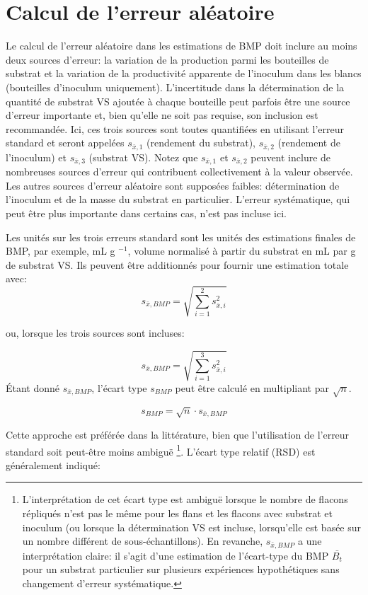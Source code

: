 \documentclass[]{article}
\begin{document}
\section{Calcul de l'erreur aléatoire}
Le calcul de l'erreur aléatoire dans les estimations de BMP doit inclure au moins deux sources d'erreur: la variation de la production  parmi les bouteilles de substrat et la variation de la productivité apparente de l'inoculum  dans les blancs (bouteilles d'inoculum uniquement).
L'incertitude dans la détermination de la quantité de substrat VS ajoutée à chaque bouteille peut parfois être une source d'erreur importante et, bien qu'elle ne soit pas requise, son inclusion est recommandée.
Ici, ces trois sources sont toutes quantifiées en utilisant l'erreur standard et seront appelées $s_{\bar{x},1}$ (rendement du substrat), $s_{\bar{x},2}$ (rendement de l'inoculum) et $s_{\bar{x},3}$ (substrat VS).
Notez que $s_{\bar{x},1}$ et $s_{\bar{x},2}$ peuvent inclure de nombreuses sources d'erreur qui contribuent collectivement à la valeur observée.
Les autres sources d'erreur aléatoire sont supposées faibles: détermination de l'inoculum et de la masse du substrat en particulier.
L'erreur systématique, qui peut être plus importante dans certains cas, n'est pas incluse ici.

Les unités sur les trois erreurs standard sont les unités des estimations finales de BMP, par exemple, mL g $^{-1}$, volume normalisé  à partir du substrat en mL par g de substrat VS.
Ils peuvent être additionnés pour fournir une estimation totale avec:
\begin{equation}
  \label{eq:se_sum}
  s_{\bar{x},BMP} = \sqrt{\sum_{i=1} ^2 s_{\bar{x},i}^2}
\end{equation}

ou, lorsque les trois sources sont incluses:

\begin{equation}
  \label{eq:se_sum_3}
  s_{\bar{x},BMP} = \sqrt{\sum_{i=1} ^3 s_{\bar{x},i}^2}
\end{equation}
Étant donné $s_{\bar{x},BMP}$, l'écart type $s_{BMP}$ peut être calculé en multipliant par $\sqrt{n}$.

\begin{equation}
  \label{eq:sd}
  s_{BMP} = \sqrt{n} \cdot s_{\bar{x},BMP}
\end{equation}

Cette approche est préférée dans la littérature, bien que l'utilisation de l'erreur standard soit peut-être moins ambiguë \footnote{L'interprétation de cet écart type est ambiguë lorsque le nombre de flacons répliqués n'est pas le même pour les flans et les flacons avec substrat et inoculum (ou lorsque la détermination VS est incluse, lorsqu'elle est basée sur un nombre différent de sous-échantillons).
En revanche, $s_{\bar{x},BMP}$ a une interprétation claire: il s'agit d'une estimation de l'écart-type du BMP $\bar{B_t}$ pour un substrat particulier sur plusieurs expériences hypothétiques sans changement d'erreur systématique.}.
L'écart type relatif (RSD) est généralement indiqué:
\end{document}
